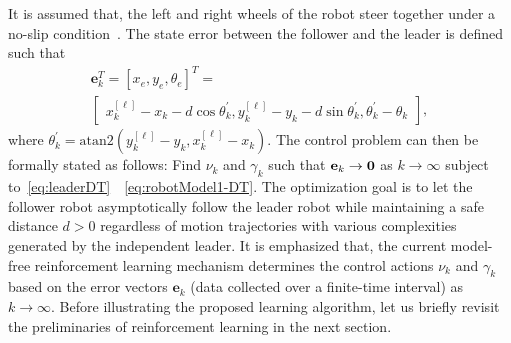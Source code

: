 \documentclass[letterpaper]{article} %
\begin{document}
%
It is assumed that, the left and right wheels of the robot steer together under a no-slip condition~\cite{Corke2011}. The state error between the follower and the leader is defined such that %
%
\begin{multline}
    \label{eq:stateError}
  \mathbf{e}_k^T = [x_e,y_e,\theta_e]^T = \\
  \begin{bmatrix}
    x_k^{[\ell]} - x_k - d\cos\theta_k^{'},
    y_k^{[\ell]} - y_k - d\sin\theta_k^{'},
    \theta_k^{'} - \theta_k
  \end{bmatrix},
\end{multline}
%
where $\theta_k^{'} = \mathrm{atan2}\left(y_k^{[\ell]}-y_k, x_k^{[\ell]}-x_k\right).$  %
%
The control problem can then be formally stated as follows: Find $\nu_k$ and $\gamma_k$ such that ${\bf e}_k\to {\bf 0}$ as  $k\to\infty$ subject to~\eqref{eq:leaderDT}~~\eqref{eq:robotModel1-DT}. %
%
The optimization goal is to let the follower robot asymptotically follow the leader robot while maintaining a safe distance $d>0$ regardless of motion trajectories with various complexities generated by the independent leader. It is emphasized that, the current model-free reinforcement learning mechanism determines  the control actions $\nu_k$ and $\gamma_k$ based on the error vectors $\mathbf{e}_k$ (data collected over a finite-time interval) as $k\to\infty.$ Before illustrating the proposed learning algorithm, let us briefly revisit the preliminaries of reinforcement learning in the next section. 
\end{document}
